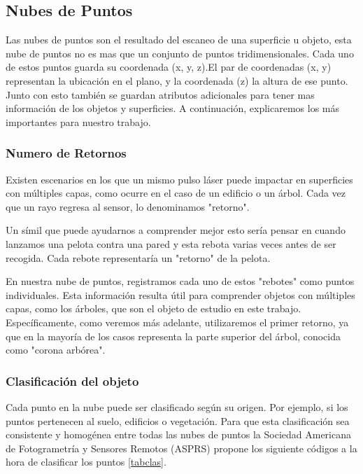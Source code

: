 \subsection{Nubes de Puntos}
Las nubes de puntos son el resultado del escaneo de una superficie u objeto, esta nube de puntos no es mas que un conjunto de puntos tridimensionales. Cada uno de estos puntos guarda su coordenada (x, y, z).El par de coordenadas (x, y) representan la ubicación en el plano, y la coordenada (z) la altura de ese punto. Junto con esto también se guardan atributos adicionales para tener mas información de los objetos y superficies. A continuación, explicaremos los más importantes para nuestro trabajo.


\subsubsection{Numero de Retornos}
Existen escenarios en los que un mismo pulso láser puede impactar en superficies con múltiples capas, como ocurre en el caso de un edificio o un árbol. Cada vez que un rayo regresa al sensor, lo denominamos "retorno".

Un símil que puede ayudarnos a comprender mejor esto sería pensar en cuando lanzamos una pelota contra una pared y esta rebota varias veces antes de ser recogida. Cada rebote representaría un "retorno" de la pelota.

En nuestra nube de puntos, registramos cada uno de estos "rebotes" como puntos individuales. Esta información resulta útil para comprender objetos con múltiples capas, como los árboles, que son el objeto de estudio en este trabajo. Específicamente, como veremos más adelante, utilizaremos el primer retorno, ya que en la mayoría de los casos representa la parte superior del árbol, conocida como "corona arbórea".

\subsubsection{Clasificación del objeto}
Cada punto en la nube puede ser clasificado según su origen. Por ejemplo, si los puntos pertenecen al suelo, edificios o vegetación. Para que esta clasificación sea consistente y homogénea entre todas las nubes de puntos la Sociedad Americana de Fotogrametría y Sensores Remotos (ASPRS) \cite{ASPRS-LAS} propone los siguiente códigos a la hora de clasificar los puntos \ref{tabclas}.

